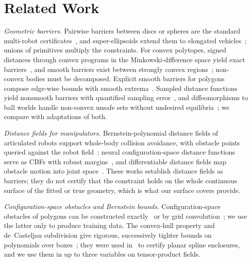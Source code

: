 \documentclass[journal]{IEEEtran}
\theoremstyle{definition}
\begin{document}
\section{Related Work}\label{sec:related}

\emph{Geometric barriers.} Pairwise barriers between discs or spheres are the standard multi-robot
certificates~\cite{wang2017safety}, and super-ellipsoids extend them to elongated
vehicles~\cite{wang2017quadrotors}; unions of primitives multiply the constraints. For convex
polytopes, signed distances through convex programs in the Minkowski-difference space yield exact
barriers~\cite{chen2025minkowski,chen2026exact}, and smooth barriers exist between strongly convex
regions~\cite{thirugnanam2025strongly}; non-convex bodies must be decomposed. Explicit smooth
barriers for polygons compose edge-wise bounds with smooth extrema~\cite{wu2025optimization}.
Sampled distance functions yield nonsmooth barriers with quantified sampling
error~\cite{lutkus2025sampling}, and diffeomorphisms to ball worlds handle non-convex unsafe sets
without undesired equilibria~\cite{notomista2021nonconvex}; we compare with adaptations of both.

\emph{Distance fields for manipulators.} Bernstein-polynomial distance fields of articulated robots
support whole-body collision avoidance, with obstacle points queried against the robot
field~\cite{li2024representing}; neural configuration-space distance functions serve as CBFs with
robust margins~\cite{long2025neural}, and differentiable distance fields map obstacle motion into
joint space~\cite{chi2024safe}. These works establish distance fields as barriers; they do not
certify that the constraint holds on the whole continuous surface of the fitted or true geometry,
which is what our surface covers provide.

\emph{Configuration-space obstacles and Bernstein bounds.} Configuration-space obstacles of polygons
can be constructed exactly~\cite{lozanoperez1983spatial,latombe1991robot} or by grid
convolution~\cite{kavraki1995fft}; we use the latter only to produce training data. The
convex-hull property and de~Casteljau subdivision give rigorous, successively tighter bounds on
polynomials over boxes~\cite{farin2002curves,sherbrooke1993computation}; they were used
in~\cite{jo2027semantic} to certify planar spline enclosures, and we use them in up to three
variables on tensor-product fields.

\end{document}
